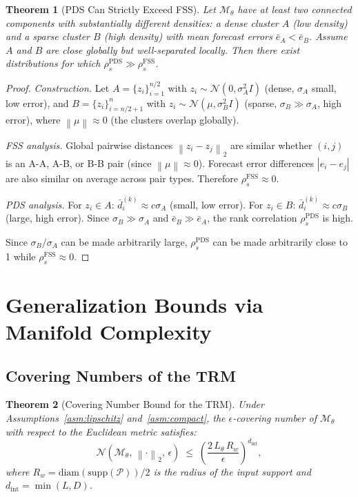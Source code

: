 \documentclass[12pt]{article}
\newtheorem{theorem}{Theorem}[section]
\theoremstyle{definition}
\theoremstyle{remark}
\newcommand{\Pset}{\mathcal{P}}
\newcommand{\Nset}{\mathcal{N}}
\newcommand{\norm}[1]{\left\lVert #1 \right\rVert}
\newcommand{\trm}{\mathcal{M}_\theta}
\newcommand{\rspear}{\rho_s}
\newcommand{\dint}{d_{\mathrm{int}}}
\begin{document}
\begin{theorem}[PDS Can Strictly Exceed FSS]
\label{thm:pds_fss}
Let $\trm$ have at least two connected components with substantially
different densities: a dense cluster $A$ (low density) and a sparse cluster
$B$ (high density) with mean forecast errors $\bar{e}_A < \bar{e}_B$.
Assume $A$ and $B$ are close globally but well-separated locally.
Then there exist distributions for which $\rspear^{\mathrm{PDS}} \gg
\rspear^{\mathrm{FSS}}$.
\end{theorem}

\begin{proof}
\emph{Construction.}
Let $A = \{z_i\}_{i=1}^{n/2}$ with $z_i \sim \mathcal{N}(0, \sigma_A^2 I)$
(dense, $\sigma_A$ small, low error), and
$B = \{z_i\}_{i=n/2+1}^n$ with $z_i \sim \mathcal{N}(\mu, \sigma_B^2 I)$
(sparse, $\sigma_B \gg \sigma_A$, high error), where $\norm{\mu} \approx 0$
(the clusters overlap globally).

\emph{FSS analysis.}
Global pairwise distances $\norm{z_i - z_j}_2$ are similar whether $(i,j)$
is an A-A, A-B, or B-B pair (since $\norm{\mu} \approx 0$). Forecast
error differences $|e_i - e_j|$ are also similar on average across pair
types. Therefore $\rspear^{\mathrm{FSS}} \approx 0$.

\emph{PDS analysis.}
For $z_i \in A$: $\bar{d}_i^{(k)} \approx c \sigma_A$ (small, low error).
For $z_i \in B$: $\bar{d}_i^{(k)} \approx c \sigma_B$ (large, high error).
Since $\sigma_B \gg \sigma_A$ and $\bar{e}_B \gg \bar{e}_A$, the rank
correlation $\rspear^{\mathrm{PDS}}$ is high.

Since $\sigma_B/\sigma_A$ can be made arbitrarily large,
$\rspear^{\mathrm{PDS}}$ can be made arbitrarily close to 1 while
$\rspear^{\mathrm{FSS}} \approx 0$.
\end{proof}

\section{Generalization Bounds via Manifold Complexity}
\label{sec:gen_bounds}

\subsection{Covering Numbers of the TRM}

\begin{theorem}[Covering Number Bound for the TRM]
\label{thm:covering}
Under Assumptions~\ref{asm:lipschitz} and~\ref{asm:compact}, the
$\epsilon$-covering number of $\trm$ with respect to the Euclidean metric
satisfies:
\[
  \Nset(\trm,\, \norm{\cdot}_2,\, \epsilon)
  \;\leq\; \left(\frac{2\,L_\theta\,R_w}{\epsilon}\right)^{\dint},
\]
where $R_w = \mathrm{diam}(\mathrm{supp}(\Pset))/2$ is the radius of the
input support and $\dint = \min(L, D)$.
\end{theorem}
\end{document}
